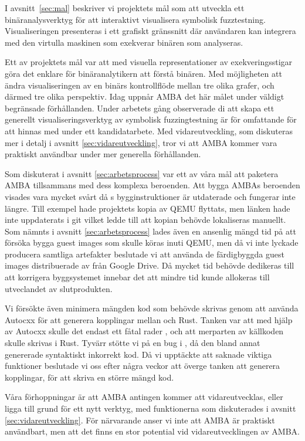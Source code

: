 I avsnitt~\ref{sec:mal} beskriver vi projektets mål som att utveckla ett
binäranalysverktyg för att interaktivt visualisera symbolisk fuzztestning.
Visualiseringen presenteras i ett grafiskt gränssnitt där användaren kan
integrera med den virtulla maskinen som exekverar binären som analyseras.

Ett av projektets mål var att med visuella representationer av exekveringsstigar
göra det enklare för binäranalytikern att förstå binären. Med möjligheten att
ändra visualiseringen av en binärs kontrollflöde mellan tre olika grafer, och därmed
tre olika perspektiv. Idag uppnår AMBA det här målet under väldigt begränsade
förhållanden. Under arbetets gång observerade di att skapa ett generellt
visualiseringsverktyg av symbolisk fuzzingtestning är för omfattande för att
hinnas med under ett kandidatarbete. Med vidareutveckling, som diskuteras mer
i detalj i avsnitt \ref{sec:vidareutveckling}, tror vi att AMBA kommer vara
praktiskt användbar under mer generella förhållanden.

Som diskuterat i avsnitt \ref{sec:arbetsprocess} var ett av våra mål att
paketera AMBA tillsammans med dess komplexa beroenden. Att bygga AMBAs beroenden
visades vara mycket svårt då \stoe{}s bygginstruktioner är utdaterade och
fungerar inte längre. Till exempel hade \stoe{} projektets kopia av QEMU
flyttats, men länken hade inte uppdaterats i git vilket ledde till att kopian
behövde lokaliseras manuellt. Som nämnts i avsnitt \ref{sec:arbetsprocess} lades
även en ansenlig mängd tid på att försöka bygga guest images som skulle köras
inuti QEMU, men då vi inte lyckade producera samtliga artefakter beslutade vi
att använda de färdigbyggda guest images distribuerade av \stoe{} från Google
Drive. Då mycket tid behövde dedikeras till att korrigera byggsystemet innebar
det att mindre tid kunde allokeras till utveclandet av slutprodukten.

Vi försökte även minimera mängden  kod som behövde skrivas genom
att använda Autocxx för att generera kopplingar mellan  och Rust.
Tanken var att med hjälp av Autocxx skulle det endast ett fåtal rader
, och att merparten av källkoden skulle skrivas i Rust. Tyvärr
stötte vi på en bug i , då den bland annat genererade
syntaktiskt inkorrekt kod. Då vi upptäckte att  saknade
viktiga funktioner beslutade vi oss efter några veckor att överge tanken att
generera kopplingar, för att skriva en större mängd  kod.

Våra förhoppningar är att AMBA antingen kommer att vidareutvecklas, eller ligga
till grund för ett nytt verktyg, med funktionerna som diskuterades i avsnitt
\ref{sec:vidareutveckling}. För närvarande anser vi inte att AMBA är praktiskt
användbart, men att det finns en stor potential vid vidareutvecklingen av AMBA.
